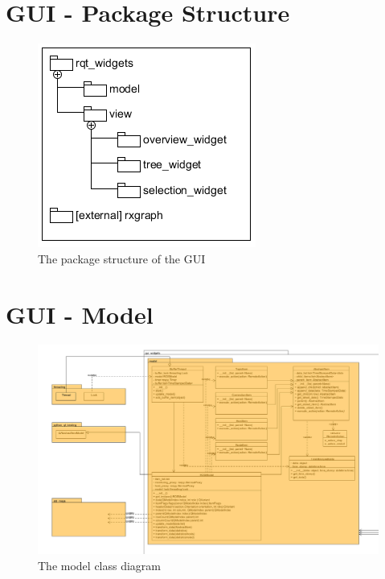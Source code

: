 \section{GUI - Package Structure}
\begin{figure}[!ht]
\begin{center}
\includegraphics[scale=1.0]{./bilder/package_structure_gui.png}
\caption{The package structure of the GUI}
\label{The package structure of the GUI}
\end{center}
\end{figure}

\mbox{}

\newpage


\section{GUI - Model}
\begin{figure}[!ht]
\begin{center}
\includegraphics[width=1.0\linewidth]{./bilder/model.png}
\caption{The model class diagram}
\end{center}
\end{figure}

